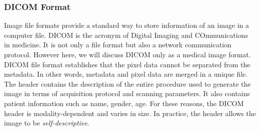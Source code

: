 \documentclass{standalone}
\begin{document}
    
\subsubsection{DICOM Format}

Image file formats provide a standard way to store information of an image in a computer file\cite{biondi}.
DICOM is the acronym of Digital Imaging and COmmunications in medicine.
It is not only a file format but also a network communication protocol\cite{Larobina}.
However here, we will discuss DICOM only as a medical image format.\\
DICOM file format establishes that the pixel data cannot be separated from the metadata\cite{Larobina}.
In other words, metadata and pixel data are merged in a unique file.
The header contains the description of the entire procedure used to generate the image in terms of acquisition protocol and scanning parameters\cite{Larobina}. 
It also contains patient information such as name, gender, age. 
For these reasons, the DICOM header is modality-dependent and varies in size. 
In practice, the header allows the image to be \textit{self-descriptive}.
\end{document}
